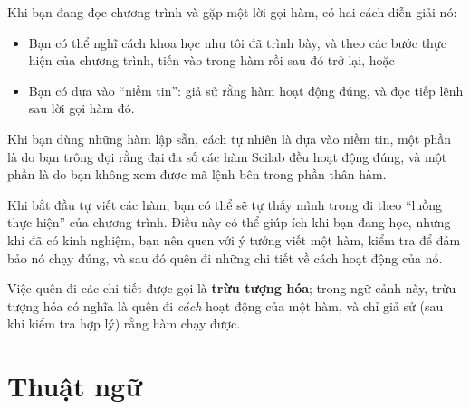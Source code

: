 \documentclass[12pt]{book}
\begin{document}
Khi bạn đang đọc chương trình và gặp một lời gọi hàm, có hai cách
diễn giải nó:

\begin{itemize}

\item Bạn có thể nghĩ cách khoa học như tôi đã trình bày, và theo
các bước thực hiện của chương trình, tiến vào trong hàm rồi sau đó
trở lại, hoặc

\item Bạn có dựa vào ``niềm tin'': giả sử rằng hàm hoạt động đúng,
và đọc tiếp lệnh sau lời gọi hàm đó.

\end{itemize}

Khi bạn dùng những hàm lập sẵn, cách tự nhiên là dựa vào niềm tin,
một phần là do bạn trông đợi rằng đại đa số các hàm Scilab đều hoạt
động đúng, và một phần là do bạn không xem được mã lệnh bên trong
phần thân hàm.

Khi bắt đầu tự viết các hàm, bạn có thể sẽ tự thấy mình trong 
đi theo ``luồng thực hiện'' của chương trình. Điều này có thể 
giúp ích khi bạn đang học, nhưng khi đã có kinh nghiệm, bạn nên
quen với ý tưởng viết một hàm, kiểm tra để đảm bảo nó chạy đúng,
và sau đó quên đi những chi tiết về cách hoạt động của nó.

Việc quên đi các chi tiết được gọi là {\bf trừu tượng hóa};
trong ngữ cảnh này, trừu tượng hóa có nghĩa là quên đi {\em cách} 
hoạt động của một hàm, và chỉ giả sử (sau khi kiểm tra hợp lý)
rằng hàm chạy được.


\section{Thuật ngữ}
\end{document}

